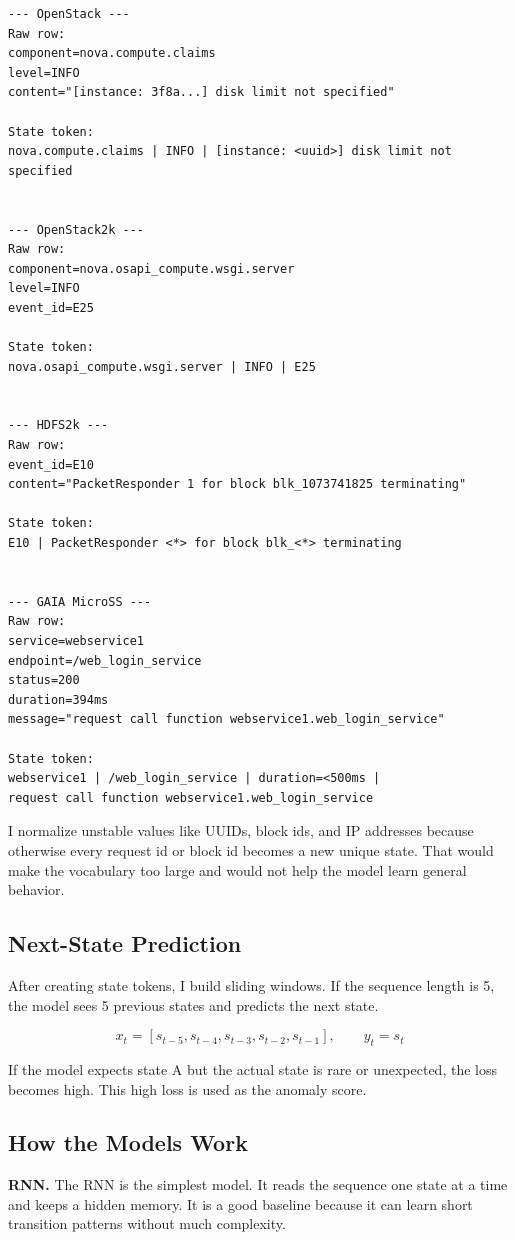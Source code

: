 \documentclass[11pt]{article}
\begin{document}
\begin{lstlisting}[caption={Examples of converting raw dataset rows into state tokens}]
--- OpenStack ---
Raw row:
component=nova.compute.claims
level=INFO
content="[instance: 3f8a...] disk limit not specified"

State token:
nova.compute.claims | INFO | [instance: <uuid>] disk limit not specified


--- OpenStack2k ---
Raw row:
component=nova.osapi_compute.wsgi.server
level=INFO
event_id=E25

State token:
nova.osapi_compute.wsgi.server | INFO | E25


--- HDFS2k ---
Raw row:
event_id=E10
content="PacketResponder 1 for block blk_1073741825 terminating"

State token:
E10 | PacketResponder <*> for block blk_<*> terminating


--- GAIA MicroSS ---
Raw row:
service=webservice1
endpoint=/web_login_service
status=200
duration=394ms
message="request call function webservice1.web_login_service"

State token:
webservice1 | /web_login_service | duration=<500ms |
request call function webservice1.web_login_service
\end{lstlisting}

I normalize unstable values like UUIDs, block ids, and IP addresses because otherwise every request id or block id becomes a new unique state. That would make the vocabulary too large and would not help the model learn general behavior.

\subsection{Next-State Prediction}

After creating state tokens, I build sliding windows. If the sequence length is 5, the model sees 5 previous states and predicts the next state.

\[
x_t = [s_{t-5}, s_{t-4}, s_{t-3}, s_{t-2}, s_{t-1}], \qquad y_t = s_t
\]

If the model expects state A but the actual state is rare or unexpected, the loss becomes high. This high loss is used as the anomaly score.

\subsection{How the Models Work}

\textbf{RNN.} The RNN is the simplest model. It reads the sequence one state at a time and keeps a hidden memory. It is a good baseline because it can learn short transition patterns without much complexity.
\end{document}
